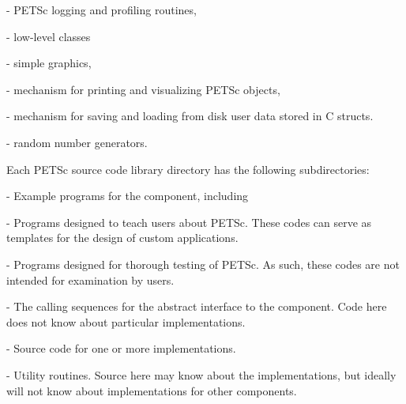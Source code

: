 \begin{tightitemize}
\begin{tightitemize}
\begin{tightitemize}
   \item {} - PETSc logging and profiling routines,
   \item {} - low-level classes
   \begin{tightitemize}
     \item {} - simple graphics,
     \item {} - mechanism for printing and visualizing PETSc objects,
     \item {} - mechanism for saving and loading from disk user data stored in C structs.
     \item {} - random number generators.
   \end{tightitemize}
\end{tightitemize}
\end{tightitemize}
\end{tightitemize}

Each PETSc source code library directory has the following subdirectories:
\begin{tightitemize}
\item  {} - Example programs for the component, including
  \begin{tightitemize}
  \item {} - Programs designed to teach users about PETSc.  These
          codes can serve as templates for the design of custom applications.
  \item {} - Programs designed for thorough testing of PETSc.  As such,
          these codes are not intended for examination by users.
  \end{tightitemize}
\item  {} - The calling sequences for the abstract interface
        to the component.
        Code here does not know about particular implementations.
\item  {} - Source code for one or more implementations.
\item  {} - Utility routines.  Source here may know about the
          implementations, but ideally will not know about implementations
          for other components.
\end{tightitemize}

